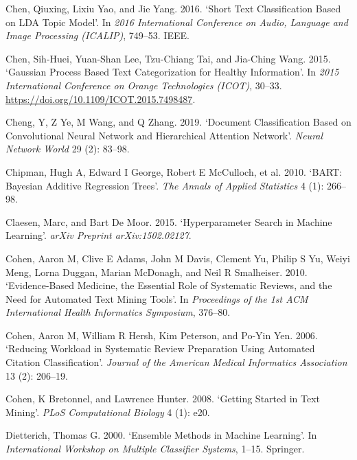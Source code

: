 \documentclass{article}
\newlength{\cslhangindent}
\newlength{\cslentryspacingunit} %
\newenvironment{CSLReferences}[2] %
 {%
  \setlength{\parindent}{0pt}
  \ifodd #1
  \let\oldpar\par
  \def\par{\hangindent=\cslhangindent\oldpar}
  \fi
  \setlength{\parskip}{#2\cslentryspacingunit}
 }%
 {}
\begin{document}
\begin{CSLReferences}{1}{0}
\leavevmode{}%
Chen, Qiuxing, Lixiu Yao, and Jie Yang. 2016. {`Short Text
Classification Based on LDA Topic Model'}. In \emph{2016 International
Conference on Audio, Language and Image Processing (ICALIP)}, 749--53.
IEEE.

\leavevmode{}%
Chen, Sih-Huei, Yuan-Shan Lee, Tzu-Chiang Tai, and Jia-Ching Wang. 2015.
{`Gaussian Process Based Text Categorization for Healthy Information'}.
In \emph{2015 International Conference on Orange Technologies (ICOT)},
30--33. \url{https://doi.org/10.1109/ICOT.2015.7498487}.

\leavevmode{}%
Cheng, Y, Z Ye, M Wang, and Q Zhang. 2019. {`Document Classification
Based on Convolutional Neural Network and Hierarchical Attention
Network'}. \emph{Neural Network World} 29 (2): 83--98.

\leavevmode{}%
Chipman, Hugh A, Edward I George, Robert E McCulloch, et al. 2010.
{`BART: Bayesian Additive Regression Trees'}. \emph{The Annals of
Applied Statistics} 4 (1): 266--98.

\leavevmode{}%
Claesen, Marc, and Bart De Moor. 2015. {`Hyperparameter Search in
Machine Learning'}. \emph{arXiv Preprint arXiv:1502.02127}.

\leavevmode{}%
Cohen, Aaron M, Clive E Adams, John M Davis, Clement Yu, Philip S Yu,
Weiyi Meng, Lorna Duggan, Marian McDonagh, and Neil R Smalheiser. 2010.
{`Evidence-Based Medicine, the Essential Role of Systematic Reviews, and
the Need for Automated Text Mining Tools'}. In \emph{Proceedings of the
1st ACM International Health Informatics Symposium}, 376--80.

\leavevmode{}%
Cohen, Aaron M, William R Hersh, Kim Peterson, and Po-Yin Yen. 2006.
{`Reducing Workload in Systematic Review Preparation Using Automated
Citation Classification'}. \emph{Journal of the American Medical
Informatics Association} 13 (2): 206--19.

\leavevmode{}%
Cohen, K Bretonnel, and Lawrence Hunter. 2008. {`Getting Started in Text
Mining'}. \emph{PLoS Computational Biology} 4 (1): e20.

\leavevmode{}%
Dietterich, Thomas G. 2000. {`Ensemble Methods in Machine Learning'}. In
\emph{International Workshop on Multiple Classifier Systems}, 1--15.
Springer.


\end{CSLReferences}
\end{document}
